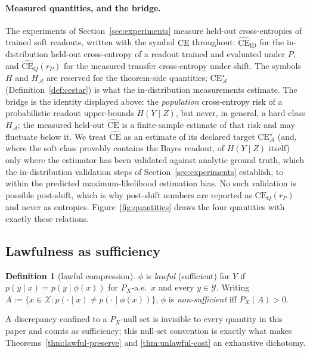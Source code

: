\documentclass[twocolumn,10pt]{article}
\theoremstyle{definition}
\newtheorem{definition}[theorem]{Definition}
\theoremstyle{remark}
\newcommand{\cA}{\mathcal{A}}
\newcommand{\cX}{\mathcal{X}}
\newcommand{\cY}{\mathcal{Y}}
\newcommand{\CE}{\mathrm{CE}}
\newcommand{\CEQ}[1]{\CE_{Q}({#1})}
\newcommand{\rP}{r_{P}}
\newcommand{\CEhat}{\widehat{\CE}}
\begin{document}
\paragraph{Measured quantities, and the bridge.} The experiments of
Section~\ref{sec:experiments} measure held-out cross-entropies of
trained soft readouts, written with the symbol $\CE$ throughout:
$\CEhat_{\mathrm{ID}}$ for the in-distribution held-out cross-entropy
of a readout trained and evaluated under $P$, and $\CEhat_{Q}(\rP)$
for the measured transfer cross-entropy under shift. The symbols $H$
and $H_{\cA}$ are reserved for the theorem-side quantities;
$\CE^{\star}_{\cA}$ (Definition~\ref{def:cestar}) is what the
in-distribution measurements estimate. The bridge is the identity
displayed above: the \emph{population} cross-entropy risk of a
probabilistic readout
upper-bounds $H(Y \mid Z)$, but never, in general, a hard-class
$H_{\cA}$; the measured held-out $\CEhat$ is a finite-sample estimate
of that risk and may fluctuate below it. We treat $\CEhat$ as an
estimate of its declared target $\CE^{\star}_{\cA}$ (and, where the
soft class provably contains the Bayes readout, of $H(Y \mid Z)$
itself) only where the estimator has been validated against analytic
ground truth, which the in-distribution validation steps of
Section~\ref{sec:experiments} establish, to within the predicted
maximum-likelihood estimation bias. No such validation is possible
post-shift, which is why post-shift numbers are reported as
$\CEQ{\rP}$ and never as entropies. Figure~\ref{fig:quantities} draws
the four quantities with exactly these relations.


\subsection{Lawfulness as sufficiency}

\begin{definition}[lawful compression]
\label{def:lawful}
$\phi$ is \emph{lawful} (sufficient) for $Y$ if
$p(y \mid x) = p(y \mid \phi(x))$ for $P_X$-a.e.\ $x$ and every
$y \in \cY$. Writing
$A := \{x \in \cX : p(\cdot \mid x) \neq p(\cdot \mid \phi(x))\}$,
$\phi$ is \emph{non-sufficient} iff $P_X(A) > 0$.
\end{definition}

A discrepancy confined to a $P_X$-null set is invisible to every quantity in
this paper and counts as sufficiency; this null-set convention is exactly
what makes Theorems~\ref{thm:lawful-preserve} and \ref{thm:unlawful-cost} an
exhaustive dichotomy.
\end{document}
